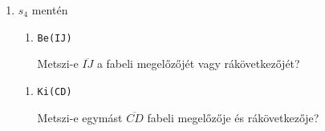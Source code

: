 \documentclass[12pt]{article}
\begin{document}
\begin{enumerate}
\begin{enumerate}
 \end{enumerate}

\item $s_4$ mentén
 \begin{enumerate}
 \item \texttt{Be(IJ)}
 
 Metszi-e $\overline{IJ}$ a fabeli megelőzőjét vagy rákövetkezőjét?
 \end{enumerate}
 
  \begin{enumerate}
  \item \texttt{Ki(CD)}
  
  Metszi-e egymást $\overline{CD}$ fabeli megelőzője és rákövetkezője?
  
  \end{enumerate}
\end{enumerate}
\end{document}

